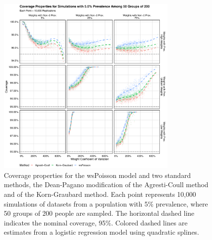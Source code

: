 \begin{figure}
\centering
\includegraphics[width=0.8\textwidth]{perfect_coverage_50_groups_0_05_prev}
\caption{Coverage properties for the wsPoisson model and two standard methods, the Dean-Pagano modification of the Agresti-Coull method and of the Korn-Graubard method.
Each point represents 10,000 simulations of datasets from a population with 5\% prevalence, where 50 groups of 200 people are sampled.
The horizontal dashed line indicates the nominal coverage, 95\%.
Colored dashed lines are estimates from a logistic regression model using quadratic splines.}
\label{ch_3:fig:perfect_coverage_50_groups_0_05_prev}
\end{figure}

